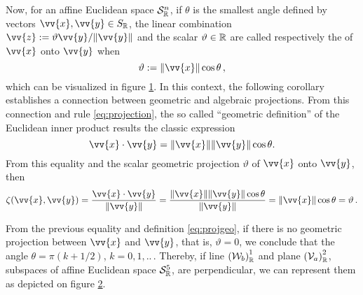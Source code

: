 Now, for an affine Euclidean space $\eamd{S}{R}{n}$, if $\theta$ is the smallest angle defined by vectors $\vv{x},\vv{y}\in S_\cam{R}$, the linear combination  $\vv{z}:=\vartheta\vv{y}/\|\vv{y}\|$ and the scalar $\vartheta\in\real$ are called respectively the  of $\vv{x}$ onto $\vv{y}$ when
\begin{equation}\label{eq:projgeo}
\vartheta:=\|\vv{x}\|\cos\theta\,,
\end{equation}
which can be visualized in figure \ref{fg:geoProject}. In this context, the following corollary establishes a connection between geometric and algebraic projections. From this connection and rule \eqref{eq:projection}, the so called ``geometric definition'' of the Euclidean inner product results the classic expression
\begin{equation}\label{eq:geoProdInt}
\vv{x}\cdot\vv{y}=\|\vv{x}\|\|\vv{y}\|\cos\theta.
\end{equation}
From this equality and the scalar geometric projection $\vartheta$ of $\vv{x}$ onto $\vv{y}$, then
\begin{equation}
\fua{\zeta}{\vv{x},\vv{y}}=\dfrac{\vv{x}\cdot \vv{y}}{\|\vv{y}\|} = \dfrac{\|\vv{x}\|\|\vv{y}\|\cos\theta }{\|\vv{y}\|}= \|\vv{x}\|\cos\theta=\vartheta\,.
\end{equation}

\begin{figure}[!ht]
	\centering
	\begin{center}
		\scalebox{.72}{}
	\end{center}
	\label{fg:geoProject}
\end{figure}

From the previous equality and definition \eqref{eq:projgeo}, if there is no geometric projection between $\vv{x}$ and $\vv{y}$, that is, $\vartheta=0$, we conclude that the angle $\theta=\pi(k+1/2)$, $k=0,1,..\,$. Thereby, if line $\eamsd{W}{\real}{b}{1}$ and plane $\eamsd{V}{\real}{a}{2}$, subspaces of affine Euclidean space $\eamd{S}{\real}{5}$, are perpendicular, we can represent them as depicted on figure \ref{fg:perpend}.
\begin{figure}[!ht]
	\centering
	\begin{center}
		\scalebox{.72}{}
	\end{center}
	\label{fg:perpend}
\end{figure}


